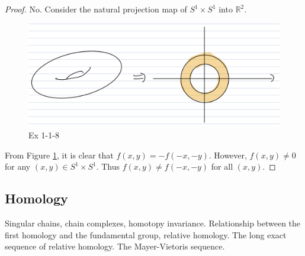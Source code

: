 \documentclass[12pt, psamsfonts]{amsart}
\theoremstyle{definition}
\theoremstyle{remark}
\numberwithin{equation}{section}
\begin{document}
\begin{proof}
  No.
  Consider the natural projection map of $S^1 \times S^1$ into $\mathbb{R}^2$.
  \begin{figure}[!htb]
    \includegraphics[width=.5\linewidth]{img/hatcher/ex-1-1-8.jpeg}
      \caption{Ex 1-1-8}
    \label{fig:ex_1_1_8}
  \end{figure}
  From Figure \ref{fig:ex_1_1_8}, it is clear that $f(x, y) = -f(-x, -y)$.
  However, $f(x, y) \ne 0$ for any $(x, y) \in S^1 \times S^1$.
  Thus $f(x, y) \ne f(-x, -y)$ for all $(x, y)$.
\end{proof}

\subsection{Homology}
Singular chains, chain complexes, homotopy invariance.
Relationship between the first homology and the fundamental group, relative homology.
The long exact sequence of relative homology.
The Mayer-Vietoris sequence.
\end{document}
